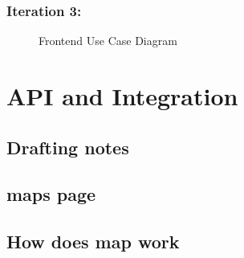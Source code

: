 \subsubsection{Iteration 3:}

\begin{figure}[h]
    \centering
    \caption{Frontend Use Case Diagram}
    \label{fig:frontend_usecase}
\end{figure}

\section{API and Integration}
\subsection{Drafting notes}

\subsection{maps page}


\subsection{How does map work}

